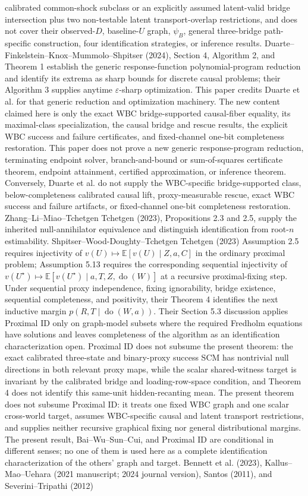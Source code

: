 \documentclass{article}
\begin{document}
calibrated common-shock subclass or an explicitly assumed latent-valid bridge intersection plus two non-testable latent transport-overlap restrictions, and does not cover their observed-\(D\), baseline-\(U\) graph, \(\psi_B\), general three-bridge path-specific construction, four identification strategies, or inference results. Duarte--Finkelstein--Knox--Mummolo--Shpitser (2024), Section 4, Algorithm 2, and Theorem 1 establish the generic response-function polynomial-program reduction and identify its extrema as sharp bounds for discrete causal problems; their Algorithm 3 supplies anytime \(\varepsilon\)-sharp optimization. This paper credits Duarte et al. for that generic reduction and optimization machinery. The new content claimed here is only the exact WBC bridge-supported causal-fiber equality, its maximal-class specialization, the causal bridge and rescue results, the explicit WBC success and failure certificates, and fixed-channel one-bit completeness restoration. This paper does not prove a new generic response-program reduction, terminating endpoint solver, branch-and-bound or sum-of-squares certificate theorem, endpoint attainment, certified approximation, or inference theorem. Conversely, Duarte et al. do not supply the WBC-specific bridge-supported class, below-completeness calibrated causal lift, proxy-measurable rescue, exact WBC success and failure artifacts, or fixed-channel one-bit completeness restoration. Zhang--Li--Miao--Tchetgen Tchetgen (2023), Propositions 2.3 and 2.5, supply the inherited null-annihilator equivalence and distinguish identification from root-\(n\) estimability. Shpitser--Wood-Doughty--Tchetgen Tchetgen (2023) Assumption 2.5 requires injectivity of \(v(U)\mapsto\mathbb E[v(U)\mid Z,a,C]\) in the ordinary proximal problem; Assumption 5.13 requires the corresponding sequential injectivity of \(v(U^\star)\mapsto\mathbb E[v(U^\star)\mid a,T,Z,\operatorname{do}(W)]\) at a recursive proximal-fixing step. Under sequential proxy independence, fixing ignorability, bridge existence, sequential completeness, and positivity, their Theorem 4 identifies the next inductive margin \(p(R,T\mid\operatorname{do}(W,a))\). Their Section 5.3 discussion applies Proximal ID only on graph-model subsets where the required Fredholm equations have solutions and leaves completeness of the algorithm as an identification characterization open. Proximal ID does not subsume the present theorem: the exact calibrated three-state and binary-proxy success SCM has nontrivial null directions in both relevant proxy maps, while the scalar shared-witness target is invariant by the calibrated bridge and loading-row-space condition, and Theorem 4 does not identify this same-unit hidden-recanting mean. The present theorem does not subsume Proximal ID: it treats one fixed WBC graph and one scalar cross-world target, assumes WBC-specific causal and latent transport restrictions, and supplies neither recursive graphical fixing nor general distributional margins. The present result, Bai--Wu--Sun--Cui, and Proximal ID are conditional in different senses; no one of them is used here as a complete identification characterization of the others' graph and target. Bennett et al. (2023), Kallus--Mao--Uehara (2021 manuscript; 2024 journal version), Santos (2011), and Severini--Tripathi (2012) 
\end{document}
